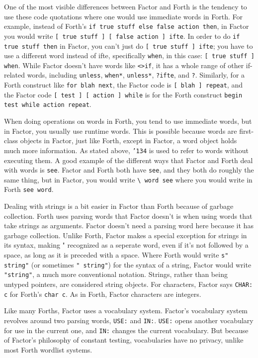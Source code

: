 \documentclass{article}
\begin{document}
One of the most visible differences between Factor and Forth is the tendency to use these code quotations where one would use immediate words in Forth. For example, instead of Forth's \verb|if true stuff else false action then|, in Factor you would write \verb|[ true stuff ] [ false action ] ifte|. In order to do \verb|if true stuff then| in Factor, you can't just do \verb|[ true stuff ] ifte|; you have to use a different word instead of ifte, specifically \texttt{when}, in this case: \verb|[ true stuff ] when|. While Factor doesn't have words like \texttt{<>if}, it has a whole range of other if-related words, including \texttt{unless}, \texttt{when*}, \texttt{unless*}, \texttt{?ifte}, and \texttt{?}. Similarly, for a Forth construct like \verb|for blah next|, the Factor code is \verb|[ blah ] repeat|, and the Factor code \verb|[ test ] [ action ] while| is for the Forth construct \verb|begin test while action repeat|.

When doing operations on words in Forth, you tend to use immediate words, but in Factor, you usually use runtime words. This is possible because words are first-class objects in Factor, just like Forth, except in Factor, a word object holds much more information. As stated above, \texttt{\char'134} is used to refer to words without executing them. A good example of the different ways that Factor and Forth deal with words is \texttt{see}. Factor and Forth both have \texttt{see}, and they both do roughly the same thing, but in Factor, you would write \verb|\ word see| where you would write in Forth \verb|see word|.

Dealing with strings is a bit easier in Factor than Forth because of garbage collection. Forth uses parsing words that Factor doesn't is when using words that take strings as arguments. Factor doesn't need a parsing word here because it has garbage collection. Unlike Forth, Factor makes a special exception for strings in its syntax, making " recognized as a seperate word, even if it's not followed by a space, as long as it is preceded with a space. Where Forth would write \verb|s" string"| (or sometimes \verb|" string"|) for the syntax of a string, Factor would write \verb|"string"|, a much more conventional notation. Strings, rather than being untyped pointers, are considered string objects. For characters, Factor says \verb|CHAR: c| for Forth's \verb|char c|. As in Forth, Factor characters are integers.

Like many Forths, Factor uses a vocabulary system. Factor's vocabulary system revolves around two parsing words, \texttt{USE:} and \texttt{IN:}. \texttt{USE:} opens another vocabulary for use in the current one, and \texttt{IN:} changes the current vocabulary. But because of Factor's philosophy of constant testing, vocabularies have no privacy, unlike most Forth wordlist systems. 
\end{document}
